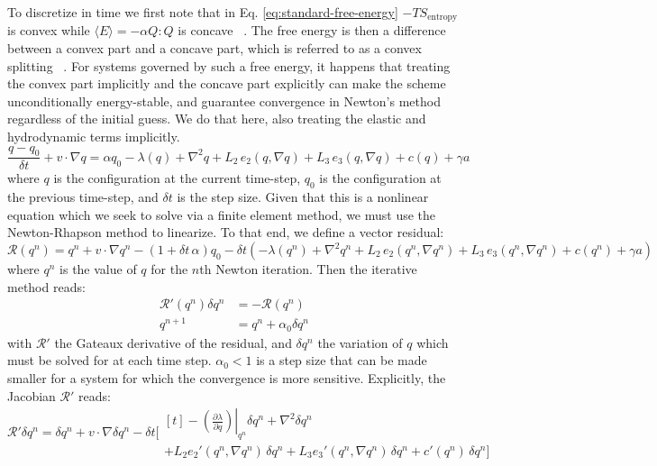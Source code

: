 \documentclass[reqno]{article}
\begin{document}
  To discretize in time we first note that in Eq. \eqref{eq:standard-free-energy}
  $-TS_\text{entropy}$ is convex while $\langle E \rangle = -\alpha Q:Q$ is
  concave ~\cite{schimming_numerical_2021}.
  The free energy is then a difference between a convex part and a concave part,
  which is referred to as a convex splitting ~\cite{xu_stability_2019}.
  For systems governed by such a free energy, it happens that treating the
  convex part implicitly and the concave part explicitly can make the scheme
  unconditionally energy-stable, and guarantee convergence in Newton's method
  regardless of the initial guess.
  We do that here, also treating the elastic and hydrodynamic terms implicitly.
  \begin{equation}
    \frac{q - q_0}{\delta t}
    + v \cdot \nabla q
    =
    \alpha q_0
    - \lambda(q)
    + \nabla^2 q
    + L_2 \, e_2(q, \nabla q)
    + L_3 \, e_3(q, \nabla q)
    + c(q)
    + \gamma a
  \end{equation}
  where $q$ is the configuration at the current time-step, $q_0$ is the
  configuration at the previous time-step, and $\delta t$ is the step size.
  Given that this is a nonlinear equation which we seek to solve via a finite
  element method, we must use the Newton-Rhapson method to linearize.
  To that end, we define a vector residual:
  \begin{equation} \label{eq:simulation-residual}
    \mathcal{R}(q^n)
    =
    q^n + v \cdot \nabla q^n
    - (1 + \delta t \, \alpha) q_0
    - 
    \delta t \left(
      -\lambda(q^n)
      + \nabla^2 q^n
      + L_2 \, e_2(q^n, \nabla q^n)
      + L_3 \, e_3(q^n, \nabla q^n)
      + c(q^n)
      + \gamma a
    \right)
  \end{equation}
  where $q^n$ is the value of $q$ for the $n$th Newton iteration.
  Then the iterative method reads:
  \begin{equation}
    \begin{split}
      \mathcal{R}'(q^n) \delta q^n &= -\mathcal{R}(q^n) \\
      q^{n + 1} &= q^n + \alpha_0 \delta q^n
    \end{split}
  \end{equation}
  with $\mathcal{R}'$ the Gateaux derivative of the residual, and $\delta q^n$
  the variation of $q$ which must be solved for at each time step.
  $\alpha_0 < 1$ is a step size that can be made smaller for a system for which
  the convergence is more sensitive.
  Explicitly, the Jacobian $\mathcal{R}'$ reads:
  \begin{equation}
    \mathcal{R}' \delta q^n
    =
      \delta q^n
      + v \cdot \nabla \delta q^n
      -\delta t \biggl[
      \begin{multlined}[t]
        - \left. \left( \frac{\partial \lambda}{\partial q} \right) \right|_{q^n} \delta q^n
        + \nabla^2 \delta q^n \\
        + L_2 e_2'(q^n, \nabla q^n) \, \delta q^n
        + L_3 e_3'(q^n, \nabla q^n) \, \delta q^n
        + c'(q^n) \, \delta q^n
      \biggr]
    \end{multlined}
  \end{equation}
\end{document}
